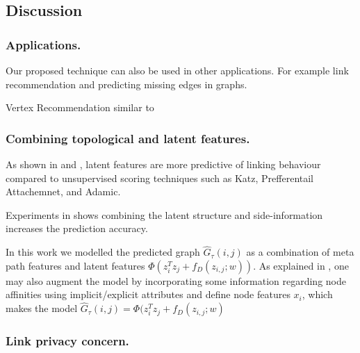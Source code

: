 

\subsection{Discussion}


\subsubsection{Applications.}

Our proposed technique can also be used in other applications. For example link recommendation and predicting missing edges in graphs.

Vertex Recommendation similar to \cite{ou2016asymmetric} 


\subsubsection{Combining topological and latent features.}

As shown in \cite{menon2011link} and \cite{Zhu2016}, latent features are more predictive of linking behaviour compared to unsupervised scoring techniques such as Katz, Prefferentail Attachemnet, and Adamic.

Experiments in \cite{menon2011link} shows combining the latent structure and side-information increases the prediction accuracy.


In this work we modelled the predicted graph $ \hat{G}_\tau(i,j)$ as a combination of meta path features and latent features $\Phi(z_{i}^Tz_{j} + f_D(z_{i,j};w))$. As explained in \cite{menon2011link}, one may also augment the model by incorporating some information regarding node affinities using implicit/explicit attributes and define node features $x_i$, which makes the model $\hat{G}_\tau(i,j) = \Phi(z_{i}^Tz_{j} + f_D(z_{i,j};w)$



\subsubsection{Link privacy concern.}

